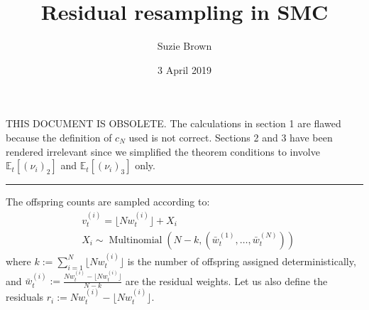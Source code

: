 \documentclass[fleqn]{article}
\title{Residual resampling in SMC}
\author{Suzie Brown}
\date{3 April 2019}
\newcommand{\E}{\mathbb{E}}
\newcommand{\Mn}{\operatorname{Multinomial}}
\newcommand{\vt}[2][t]{v_{#1}^{(#2)}}
\newcommand{\wt}[2][t]{w_{#1}^{(#2)}}
\newcommand{\wbar}[2][t]{\bar{w}_{#1}^{(#2)}}
\begin{document}
\maketitle
\thispagestyle{fancy}

THIS DOCUMENT IS OBSOLETE. The calculations in section 1 are flawed because the definition of $c_N$ used is not correct. Sections 2 and 3 have been rendered irrelevant since we simplified the theorem conditions to involve $\E_t[(\nu_i)_2]$ and $\E_t[(\nu_i)_3]$ only.\\
\hrule
\vspace{10pt}

%
%
%

%
%
The offspring counts are sampled according to:
\begin{align*}
& \vt{i} = \lfloor N \wt{i} \rfloor + X_i \\
& X_i \sim \Mn (N-k, (\wbar{1}, \dots, \wbar{N}))
\end{align*}
where $k := \sum_{i=1}^N \lfloor N \wt{i} \rfloor$ is the number of offspring assigned deterministically, and $\wbar{i} := \frac{N\wt{i} - \lfloor N \wt{i} \rfloor}{N - k}$ are the residual weights. Let us also define the residuals $r_i := N\wt{i} - \lfloor N \wt{i} \rfloor$.
\end{document}
